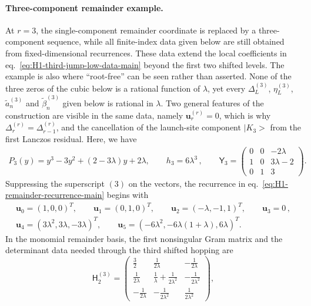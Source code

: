 \documentclass[a4paper,11pt]{article}
\def\ket#1{|#1>}%
\theoremstyle{definition}
\theoremstyle{remark}
\newcommand{\ket}[1]{|#1\rangle}
\begin{document}
\paragraph{Three-component remainder example.}
At $r=3$, the single-component remainder coordinate is replaced by a three-component sequence, while all finite-index data given below are still obtained from fixed-dimensional recurrences. These data extend the local coefficients in eq.~\eqref{eq:H1-third-jump-low-data-main} beyond the first two shifted levels. The example is also where ``root-free'' can be seen rather than asserted. None of the three zeros of the cubic below is a rational function of $\lambda$, yet every $\Delta_L^{(3)}$, $\eta_L^{(3)}$, $\widetilde a_n^{(3)}$ and $\widetilde\beta_n^{(3)}$ given below is rational in $\lambda$. Two general features of the construction are visible in the same data, namely $\mathbf u_r^{(r)}=0$, which is why $\Delta_r^{(r)}=\Delta_{r-1}^{(r)}$, and the cancellation of the launch-site component $\ket{K_3}$ from the first Lanczos residual. Here, we have
\begin{equation}
\begin{aligned}
   P_3(y)=y^3-3y^2+(2-3\lambda)y+2\lambda,\qquad
   h_3=6\lambda^3\,, \qquad
   \mathsf Y_3=
   \begin{pmatrix}
      0&0&-2\lambda\\
      1&0&3\lambda-2\\
      0&1&3
   \end{pmatrix}.
\end{aligned}
   \label{eq:H1-r3-P-M-app}
\end{equation}
Suppressing the superscript $(3)$ on the vectors, the recurrence in eq.~\eqref{eq:H1-remainder-recurrence-main} begins with
\begin{equation}
\begin{gathered}
   \mathbf u_0=(1,0,0)^T,\qquad
   \mathbf u_1=(0,1,0)^T,\qquad
   \mathbf u_2=(-\lambda,-1,1)^T,\qquad
   \mathbf u_3=0\,,\\
   \mathbf u_4=(3\lambda^2,3\lambda,-3\lambda)^T,\qquad
   \mathbf u_5=(-6\lambda^2,-6\lambda(1+\lambda),6\lambda)^T.
\end{gathered}
   \label{eq:H1-r3-u-app}
\end{equation}
In the monomial remainder basis, the first nonsingular Gram matrix and the determinant data needed through the third shifted hopping are
\begin{equation}
   \mathsf H_2^{(3)}=
   \begin{pmatrix}
      \frac32&\frac{1}{2\lambda}&-\frac{1}{2\lambda}\\
      \frac{1}{2\lambda}&\frac1\lambda+\frac{1}{2\lambda^2}&-\frac{1}{2\lambda^2}\\
      -\frac{1}{2\lambda}&-\frac{1}{2\lambda^2}&\frac{1}{2\lambda^2}
   \end{pmatrix},
   \label{eq:H1-r3-H2-app}
\end{equation}
\end{document}
